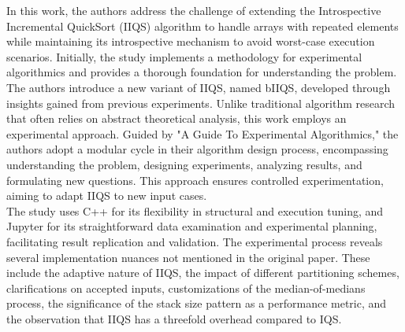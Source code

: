 \documentclass{iccmemoria}
\author{Erik Andrés Regla Torres}
\date{mes, año}
\begin{document}
\maketitle

\tableofcontents
\listoffigures
\listoftables

\begin{resumen}
In this work, the authors address the challenge of extending the Introspective Incremental QuickSort (IIQS) algorithm to handle arrays with repeated elements while maintaining its introspective mechanism to avoid worst-case execution scenarios. Initially, the study implements a methodology for experimental algorithmics and provides a thorough foundation for understanding the problem.\\

The authors introduce a new variant of IIQS, named bIIQS, developed through insights gained from previous experiments. Unlike traditional algorithm research that often relies on abstract theoretical analysis, this work employs an experimental approach. Guided by "A Guide To Experimental Algorithmics," the authors adopt a modular cycle in their algorithm design process, encompassing understanding the problem, designing experiments, analyzing results, and formulating new questions. This approach ensures controlled experimentation, aiming to adapt IIQS to new input cases.\\

The study uses C++ for its flexibility in structural and execution tuning, and Jupyter for its straightforward data examination and experimental planning, facilitating result replication and validation. The experimental process reveals several implementation nuances not mentioned in the original paper. These include the adaptive nature of IIQS, the impact of different partitioning schemes, clarifications on accepted inputs, customizations of the median-of-medians process, the significance of the stack size pattern as a performance metric, and the observation that IIQS has a threefold overhead compared to IQS.
\end{resumen}





\end{document}

